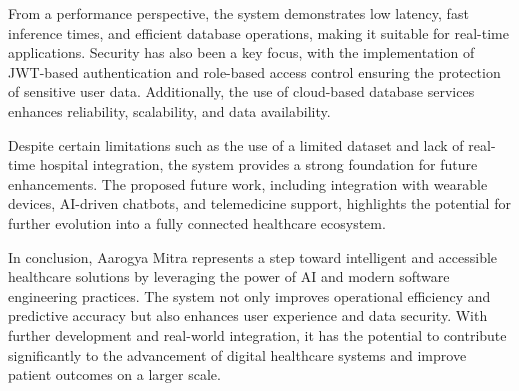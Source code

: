 \documentclass[conference]{IEEEtran}
\begin{document}
From a performance perspective, the system demonstrates low latency, fast inference times, and efficient database operations, making it suitable for real-time applications. Security has also been a key focus, with the implementation of JWT-based authentication and role-based access control ensuring the protection of sensitive user data. Additionally, the use of cloud-based database services enhances reliability, scalability, and data availability.

Despite certain limitations such as the use of a limited dataset and lack of real-time hospital integration, the system provides a strong foundation for future enhancements. The proposed future work, including integration with wearable devices, AI-driven chatbots, and telemedicine support, highlights the potential for further evolution into a fully connected healthcare ecosystem.

In conclusion, Aarogya Mitra represents a step toward intelligent and accessible healthcare solutions by leveraging the power of AI and modern software engineering practices. The system not only improves operational efficiency and predictive accuracy but also enhances user experience and data security. With further development and real-world integration, it has the potential to contribute significantly to the advancement of digital healthcare systems and improve patient outcomes on a larger scale.
 
\end{document}
